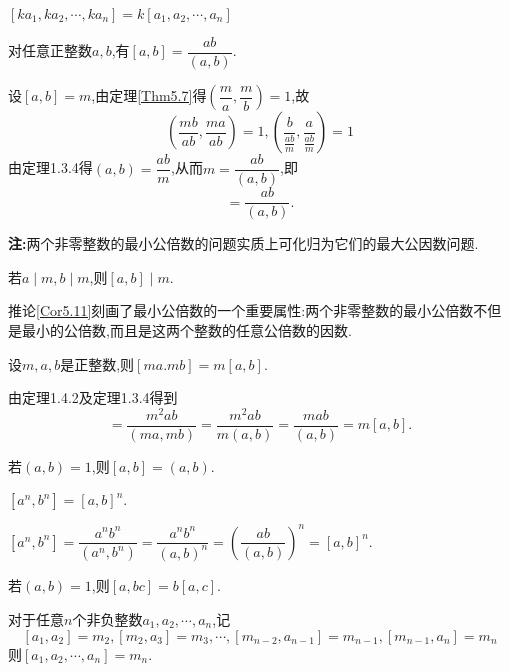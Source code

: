 \theorem [推论1.4.2]$[ka_{1},ka_{2},\cdots,ka_{n}]=k[a_{1},a_{2},\cdots,a_{n}]$

\theorem [定理1.4.2]对任意正整数$a,b$,有$[a,b]=\dfrac{ab}{(a,b)}$.

\proof 设$[a,b]=m$,由定理\ref{Thm5.7}得$\left(\dfrac{m}{a}, \dfrac{m}{b}\right)=1$,故
\begin{equation*}
	\left(\frac{m b}{a b}, \frac{m a}{a b}\right)=1,\left(\frac{b}{\frac{a b}{m}}, \frac{a}{\frac{a b}{m}}\right)=1
\end{equation*}
由定理1.3.4得$(a, b)=\dfrac{a b}{m}$,从而$m=\dfrac{a b}{(a, b)}$,即
\begin{equation*}
	[a,b]=\frac{a b}{(a, b)}.
\end{equation*}

\entry \textbf{注:}两个非零整数的最小公倍数的问题实质上可化归为它们的最大公因数问题.

\corollary [推论1.4.1]若$a\mid m,b\mid m$,则$[a, b]\mid m$.\label{Cor5.11}

\entry 推论\ref{Cor5.11}刻画了最小公倍数的一个重要属性:两个非零整数的最小公倍数不但是最小的公倍数,而且是这两个整数的任意公倍数的因数.

\corollary [推论1.4.2]设$m,a,b$是正整数,则$[ma.mb]=m[a,b]$.

\proof 由定理1.4.2及定理1.3.4得到
\begin{equation*}
	[m a, m b]=\frac{m^{2} a b}{(m a, m b)}=\frac{m^{2} a b}{m(a, b)}=\frac{m a b}{(a, b)}=m[a, b].
\end{equation*}

\corollary 若$(a,b)=1$,则$[a,b]=(a,b)$.

\corollary $[a^{n},b^{n}]=[a,b]^{n}$.

\proof $[a^{n},b^{n}]=\dfrac{a^{n}b^{n}}{(a^{n},b^{n})}=\dfrac{a^{n}b^{n}}{(a,b)^{n}}=\left( \dfrac{ab}{(a,b)}\right)^{n}=[a,b]^{n} $.

\corollary 若$(a,b)=1$,则$[a,bc]=b[a,c]$.

\theorem [定理1.4.3]对于任意$n$个非负整数$a_{1},a_{2},\cdots,a_{n}$,记
\begin{equation*}
	\left[a_{1}, a_{2}\right]=m_{2},\left[m_{2}, a_{3}\right]=m_{3}, \cdots,\left[m_{n-2}, a_{n-1}\right]=m_{n-1},\left[m_{n-1}, a_{n}\right]=m_{n}
\end{equation*}
则$\left[a_{1}, a_{2}, \cdots, a_{n}\right]=m_{n}$.

